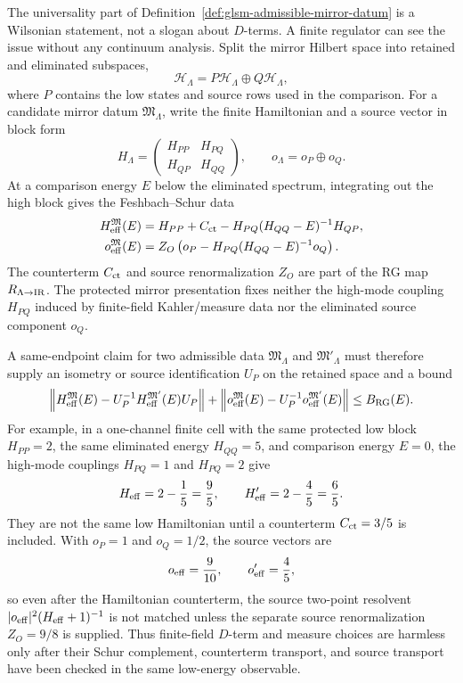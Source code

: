 \begin{remark}
\label{rem:glsm-mirror-dterm-rg-schur-obligation}
The universality part of
Definition~\ref{def:glsm-admissible-mirror-datum} is a Wilsonian statement, not
a slogan about \(D\)-terms.  A finite regulator can see the issue without any
continuum analysis.  Split the mirror Hilbert space into retained and eliminated
subspaces,
\[
  {\mathcal H}_\Lambda=P{\mathcal H}_\Lambda\oplus Q{\mathcal H}_\Lambda,
\]
where \(P\) contains the low states and source rows used in the comparison.
For a candidate mirror datum \(\mathfrak M_\Lambda\), write the finite
Hamiltonian and a source vector in block form
\[
  H_\Lambda=
  \begin{pmatrix}
  H_{PP}&H_{PQ}\\
  H_{QP}&H_{QQ}
  \end{pmatrix},
  \qquad
  o_\Lambda=o_P\oplus o_Q .
\]
At a comparison energy \(E\) below the eliminated spectrum, integrating out the
high block gives the Feshbach--Schur data
\begin{align}
  H_{\rm eff}^{\mathfrak M}(E)
  &=
  H_{PP}+C_{\rm ct}
  -H_{PQ}(H_{QQ}-E)^{-1}H_{QP},
  \label{eq:glsm-mirror-dterm-rg-schur-hamiltonian}\\
  o_{\rm eff}^{\mathfrak M}(E)
  &=
  Z_O\left(
    o_P-H_{PQ}(H_{QQ}-E)^{-1}o_Q
  \right).
  \label{eq:glsm-mirror-dterm-rg-schur-source}
\end{align}
The counterterm \(C_{\rm ct}\) and source renormalization \(Z_O\) are part of
the RG map \(R_{\Lambda\to{\rm IR}}\).  The protected mirror presentation fixes
neither the high-mode coupling \(H_{PQ}\) induced by finite-field Kahler/measure
data nor the eliminated source component \(o_Q\).

A same-endpoint claim for two admissible data \(\mathfrak M_\Lambda\) and
\(\mathfrak M'_\Lambda\) must therefore supply an isometry or source
identification \(U_P\) on the retained space and a bound
\begin{equation}
  \left\|
  H_{\rm eff}^{\mathfrak M}(E)
  -
  U_P^{-1}H_{\rm eff}^{\mathfrak M'}(E)U_P
  \right\|
  +
  \left\|
  o_{\rm eff}^{\mathfrak M}(E)
  -
  U_P^{-1}o_{\rm eff}^{\mathfrak M'}(E)
  \right\|
  \le B_{\rm RG}(E).
  \label{eq:glsm-mirror-dterm-rg-schur-bound}
\end{equation}
For example, in a one-channel finite cell with the same protected low block
\(H_{PP}=2\), the same eliminated energy \(H_{QQ}=5\), and comparison energy
\(E=0\), the high-mode couplings \(H_{PQ}=1\) and \(H_{PQ}=2\) give
\[
  H_{\rm eff}=2-\frac15=\frac95,
  \qquad
  H'_{\rm eff}=2-\frac45=\frac65 .
\]
They are not the same low Hamiltonian until a counterterm \(C_{\rm ct}=3/5\) is
included.  With \(o_P=1\) and \(o_Q=1/2\), the source vectors are
\[
  o_{\rm eff}=\frac9{10},\qquad
  o'_{\rm eff}=\frac45 ,
\]
so even after the Hamiltonian counterterm, the source two-point resolvent
\(|o_{\rm eff}|^2(H_{\rm eff}+1)^{-1}\) is not matched unless the separate
source renormalization \(Z_O=9/8\) is supplied.  Thus finite-field \(D\)-term
and measure choices are harmless only after their Schur complement, counterterm
transport, and source transport have been checked in the same low-energy
observable.


\end{remark}
